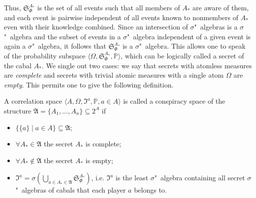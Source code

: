 Thus, $\mathfrak{S}_\Phi^{A_*}$ is the set of all events such that all members of $A_*$ are aware of them, and each event is pairwise independent of all events known to nonmembers of $A_*$ even with their knowledge combined. Since an intersection of $\sigma$"~algebras is a $\sigma$"~algebra and the subset of events in a $\sigma$"~algebra independent of a given event is again a $\sigma$"~algebra, it follows that $\mathfrak{S}_\Phi^{A_*}$ is a $\sigma$"~algebra. This allows one to speak of the probability subspace $\langle \Omega, \mathfrak{S}_\Phi^{A_*}, \mathbb{P} \rangle$, which can be logically called a secret of the cabal $A_*$. We single out two cases: we say that secrets with atomless measures are \emph{complete} and secrets with trivial atomic measures with a single atom $\Omega$ are \emph{empty}. This permits one to give the following definition. %
\begin{definition}
	A correlation space $\langle A, \Omega, \mathfrak{I}^a, \mathbb{P}, a \in A \rangle$ is called a conspiracy space of the structure $\mathfrak{A} = \{A_1, ..., A_n\} \subseteq 2^A$ if %
	\begin{itemize}
		\item $\{\{a\} \mid a \in A\} \subseteq \mathfrak{A}$;
		\item $\forall A_* \in \mathfrak{A}$ the secret $A_*$ is complete;
		\item $\forall A_* \notin \mathfrak{A}$ the secret $A_*$ is empty;
		\item $\mathfrak{I}^a = \sigma(\bigcup\limits_{a \in A_* \in \mathfrak{A}}\mathfrak{S}_\Phi^{A_*})$, i.e. $\mathfrak{I}^a$ is the least $\sigma$"~algebra containing all secret $\sigma$"~algebras of cabals that each player $a$ belongs to.
	\end{itemize}
\end{definition}

